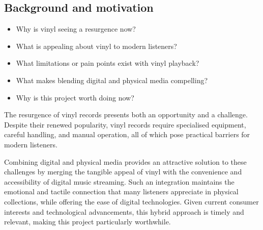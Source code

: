     
        \subsection{Background and motivation}
        
            \begin{temp}
                \begin{itemize}
                    \item Why is vinyl seeing a resurgence now?
                    \item What is appealing about vinyl to modern listeners?
                    \item What limitations or pain points exist with vinyl playback?
                    \item What makes blending digital and physical media compelling?
                    \item Why is this project worth doing now?
                \end{itemize}
            \end{temp}
    
           The resurgence of vinyl records presents both an opportunity and a challenge. Despite their renewed popularity, vinyl records require specialised equipment, careful handling, and manual operation, all of which pose practical barriers for modern listeners.
    
            Combining digital and physical media provides an attractive solution to these challenges by merging the tangible appeal of vinyl with the convenience and accessibility of digital music streaming. Such an integration maintains the emotional and tactile connection that many listeners appreciate in physical collections, while offering the ease of digital technologies. Given current consumer interests and technological advancements, this hybrid approach is timely and relevant, making this project particularly worthwhile.
        

